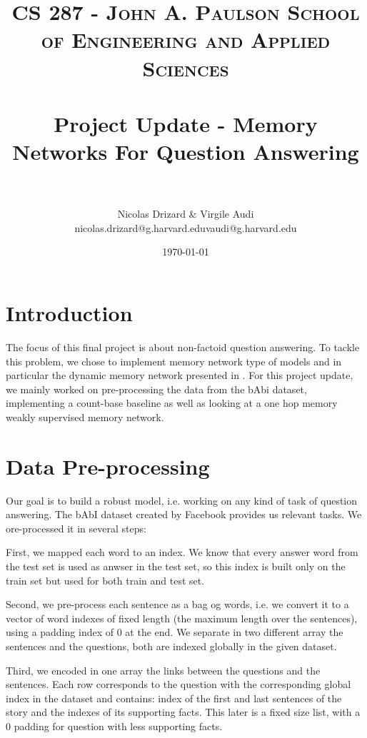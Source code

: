 \documentclass[paper=a4, fontsize=11pt]{scrartcl} %
\title{	
\normalfont \normalsize 
\textsc{CS 287 - John A. Paulson School of Engineering and Applied Sciences} \\ [25pt] %
\horrule{0.5pt} \\[0.4cm] %
\huge Project Update - Memory Networks For Question Answering \\ %
\horrule{2pt} \\[0.5cm] %
}
\author{Nicolas Drizard \& Virgile Audi\\
nicolas.drizard@g.harvard.edu\quad vaudi@g.harvard.edu} %
\date{\normalsize\today} %
\numberwithin{equation}{section} %
\numberwithin{figure}{section} %
\numberwithin{table}{section} %
\begin{document}
\maketitle %


\section*{Introduction}

The focus of this final project is about non-factoid question answering. To tackle this problem, we chose to implement memory network type of models and in particular the dynamic memory network presented in \cite{dmn}. For this project update, we mainly worked on pre-processing the data from the bAbi dataset, implementing a count-base baseline as well as looking at a one hop memory weakly supervised memory network.



\section{Data Pre-processing}

Our goal is to build a robust model, i.e. working on any kind of task of question answering. The bAbI dataset created by Facebook \cite{aiqua} provides us relevant tasks. We ore-processed it in several steps:

First, we mapped each word to an index. We know that every answer word from the test set is used as anwser in the test set, so this index is built only on the train set but used for both train and test set.

Second, we pre-process each sentence as a bag og words, i.e. we convert it to a vector of word indexes of fixed length (the maximum length over the sentences), using a padding index of 0 at the end. We separate in two different array the sentences and the questions, both are indexed globally in the given dataset.

Third, we encoded in one array the links between the questions and the sentences. Each row corresponds to the question with the corresponding global index in the dataset and contains: index of the first and last sentences of the story and the indexes of its supporting facts. This later is a fixed size list, with a 0 padding for question with less supporting facts.
\end{document}
